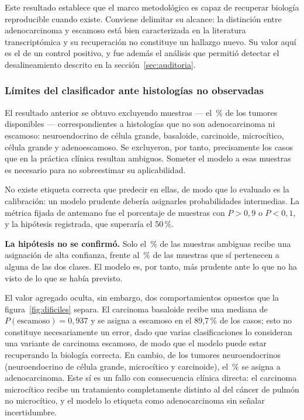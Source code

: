 Este resultado establece que el marco metodológico es capaz de recuperar
biología reproducible cuando existe. Conviene delimitar su alcance: la
distinción entre adenocarcinoma y escamoso está bien caracterizada en la
literatura transcriptómica y su recuperación no constituye un hallazgo nuevo. Su
valor aquí es el de un control positivo, y fue además el análisis que permitió
detectar el desalineamiento descrito en la sección~\ref{sec:auditoria}.

\subsubsection{Límites del clasificador ante histologías no observadas}
\label{sec:dificiles}

El resultado anterior se obtuvo excluyendo \nambiguas{} muestras --- el \pctexcluidas\,\% de los
tumores disponibles --- correspondientes a histologías que no son adenocarcinoma
ni escamoso: neuroendocrino de célula grande, basaloide, carcinoide,
microcítico, célula grande y adenoescamoso. Se excluyeron, por tanto,
precisamente los casos que en la práctica clínica resultan ambiguos. Someter el
modelo a esas muestras es necesario para no sobreestimar su aplicabilidad.

No existe etiqueta correcta que predecir en ellas, de modo que lo evaluado es la
calibración: un modelo prudente debería asignarles probabilidades intermedias.
La métrica fijada de antemano fue el porcentaje de muestras con $P>0{,}9$ o
$P<0{,}1$, y la hipótesis registrada, que superaría el 50\,\%.



\textbf{La hipótesis no se confirmó.} Solo el \pctconfambiguas\,\% de las muestras ambiguas
recibe una asignación de alta confianza, frente al \pctconfvistas\,\% de las muestras que
sí pertenecen a alguna de las dos clases. El modelo es, por tanto, más prudente
ante lo que no ha visto de lo que se había previsto.

El valor agregado oculta, sin embargo, dos comportamientos opuestos que la
figura~\ref{fig:dificiles} separa. El carcinoma basaloide recibe una mediana de
$P(\text{escamoso})=0{,}937$ y se asigna a escamoso en el 89,7\,\% de los casos;
esto no constituye necesariamente un error, dado que varias clasificaciones lo
consideran una variante de carcinoma escamoso, de modo que el modelo puede estar
recuperando la biología correcta. En cambio, de los \nneuro{} tumores neuroendocrinos
(neuroendocrino de célula grande, microcítico y carcinoide), el \pctneuroadc\,\% se asigna
a adenocarcinoma. Este sí es un fallo con consecuencia clínica directa: el
carcinoma microcítico recibe un tratamiento completamente distinto al del cáncer
de pulmón no microcítico, y el modelo lo etiqueta como adenocarcinoma sin
señalar incertidumbre.

